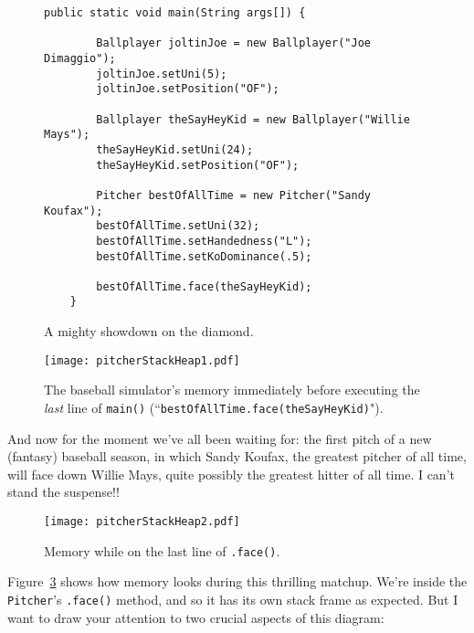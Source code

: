 \begin{figure}[ht]
\begin{Verbatim}[fontsize=\small,samepage=true,frame=single]
    public static void main(String args[]) {

        Ballplayer joltinJoe = new Ballplayer("Joe Dimaggio");
        joltinJoe.setUni(5);
        joltinJoe.setPosition("OF");

        Ballplayer theSayHeyKid = new Ballplayer("Willie Mays");
        theSayHeyKid.setUni(24);
        theSayHeyKid.setPosition("OF");

        Pitcher bestOfAllTime = new Pitcher("Sandy Koufax");
        bestOfAllTime.setUni(32);
        bestOfAllTime.setHandedness("L");
        bestOfAllTime.setKoDominance(.5);

        bestOfAllTime.face(theSayHeyKid);
    }
\end{Verbatim}
\caption{A mighty showdown on the diamond.}
\label{fig:showdownCode}
\end{figure}

\begin{figure}[ht]
\centering
\texttt{[image: pitcherStackHeap1.pdf]}  %
\caption{The baseball simulator's memory immediately before executing the
\textit{last} line of \texttt{main()} (``\texttt{bestOfAllTime.face(theSayHeyKid)}").}
\label{fig:pitcherStackHeap1}
\end{figure}


And now for the moment we've all been waiting for: the first pitch of a new
(fantasy) baseball season, in which Sandy Koufax, the greatest pitcher of all
time, will face down Willie Mays, quite possibly the greatest hitter of all
time. I can't stand the suspense!!

\begin{figure}[ht]
\centering
\texttt{[image: pitcherStackHeap2.pdf]}  %
\caption{Memory while on the last line of \texttt{.face()}.}
\label{fig:pitcherStackHeap2}
\end{figure}

Figure~\ref{fig:pitcherStackHeap2} shows how memory looks during this
thrilling matchup. We're inside the \texttt{Pitcher}'s \texttt{.face()}
method, and so it has its own stack frame as expected. But I want to draw your
attention to two crucial aspects of this diagram:

